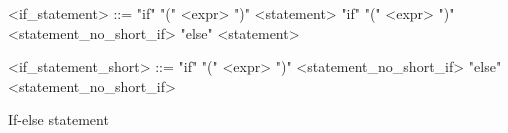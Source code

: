 \begin{Grammar}
 \begin{grammar}

    <if\_statement> ::= "if" "(" <expr> ")" <statement>
 \alt "if" "(" <expr> ")" <statement\_no\_short\_if> "else" <statement>
 
 <if\_statement\_short> ::= "if" "(" <expr> ")" <statement\_no\_short\_if> "else" <statement\_no\_short\_if>
  
 \end{grammar}
 \caption{If-else statement}\label{gra:if-else}
\end{Grammar}